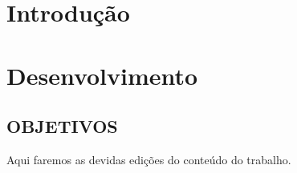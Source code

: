 \pagestyle{simple}
\chapter[]{Introdução}
\lipsum[1-3]

\chapter{Desenvolvimento}
\section{OBJETIVOS}
Aqui faremos as devidas edições do conteúdo do trabalho.

\lipsum[1-5]